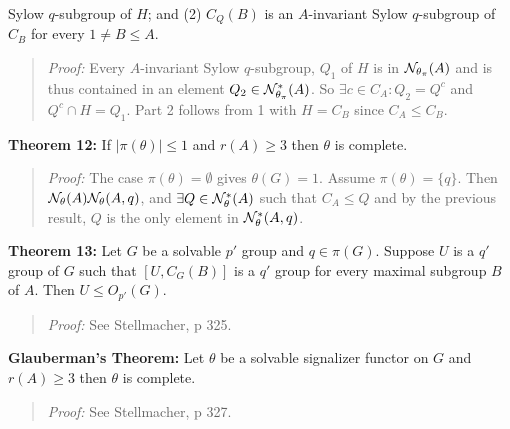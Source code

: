 Sylow $q$-subgroup of $H$;  and (2)
$C_Q(B)$ is an $A$-invariant Sylow $q$-subgroup of $C_B$ for every $1 \ne B \le A$.
\begin{quote}
\emph{Proof:}  
Every $A$-invariant Sylow $q$-subgroup, $Q_1$ of $H$ is in
${\cal N}_{\theta_{\pi}}(A)$ and is thus contained in an element $Q_2 \in
{\cal N}^*_{\theta_{\pi}}(A)$.  So $\exists c \in C_A: Q_2= Q^c$ and 
$Q^c \cap H = Q_1$.  Part 2 follows from 1 with $H= C_B$ since $C_A \le C_B$.
\end{quote}
{\bf Theorem 12:}
If $|\pi(\theta)| \le 1$ and $r(A) \ge 3$ then $\theta$ is complete.
\begin{quote}
\emph{Proof:}  
The case $\pi(\theta) = \emptyset$ gives $\theta(G) = 1$.
Assume $\pi(\theta)= \{ q \}$.  Then
$ {\cal N}_{\theta}(A) {\cal N}_{\theta}(A, q) $, and 
$\exists Q \in {\cal N}^*_{\theta}(A) $
such that $C_A \le Q$ and by the previous result, $Q$ is the only element in
${\cal N}^*_{\theta}(A, q) $.
\end{quote}
{\bf Theorem 13:}
Let $G$ be a solvable $p'$ group and $q \in \pi(G)$.  Suppose $U$ is a $q'$ group of
$G$ such that $[U,C_G(B)]$ is a $q'$ group for every maximal subgroup $B$ of $A$.  Then
$U \leq O_{p'}(G)$.
\begin{quote}
\emph{Proof:} See Stellmacher, p 325.
\end{quote}
{\bf Glauberman's Theorem:} Let $\theta$ be a solvable signalizer functor on $G$
and $r(A) \ge 3$ then $\theta$ is complete.
\begin{quote}
\emph{Proof:} See Stellmacher, p 327.
\end{quote}
